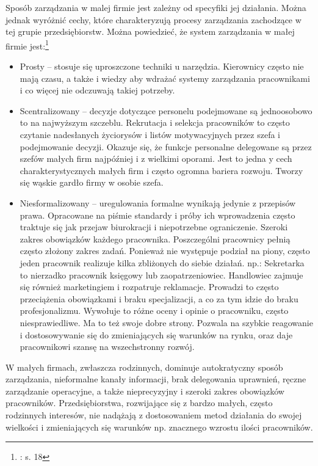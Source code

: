 Sposób zarządzania w malej firmie jest zależny od specyfiki jej działania. Można jednak wyróżnić cechy, które charakteryzują procesy zarządzania zachodzące w tej grupie przedsiębiorstw.
Można powiedzieć, że system zarządzania w małej firmie jest:\footnote{\cite{msr}: s. 18}
\begin{itemize}
\item Prosty – stosuje się uproszczone techniki u narzędzia. Kierownicy często nie mają czasu, a także i wiedzy aby wdrażać systemy zarządzania pracownikami i co więcej nie odczuwają takiej potrzeby.
\item Scentralizowany – decyzje dotyczące personelu podejmowane są jednoosobowo to na najwyższym szczeblu. Rekrutacja i selekcja pracowników to często czytanie nadesłanych życiorysów i listów motywacyjnych przez szefa i podejmowanie decyzji.
Okazuje się, że funkcje personalne delegowane są przez szefów małych firm najpóźniej i z wielkimi oporami. Jest to jedna y cech charakterystycznych małych firm i często ogromna bariera rozwoju. Tworzy się wąskie gardło firmy w osobie szefa.
\item Niesformalizowany – uregulowania formalne wynikają jedynie z przepisów prawa. Opracowane na piśmie standardy i próby ich wprowadzenia często traktuje się jak przejaw biurokracji i niepotrzebne ograniczenie.
Szeroki zakres obowiązków każdego pracownika. Poszczególni pracownicy pełnią często złożony zakres zadań. Ponieważ nie występuje podział na piony, często jeden pracownik realizuje kilka zbliżonych do siebie działań. np.: Sekretarka  to nierzadko pracownik księgowy lub zaopatrzeniowiec. Handlowiec zajmuje się również marketingiem i rozpatruje reklamacje. Prowadzi to często przeciążenia obowiązkami i braku specjalizacji, a co za tym idzie do braku profesjonalizmu. Wywołuje to różne oceny i opinie o pracowniku, często niesprawiedliwe.
Ma to też swoje dobre strony. Pozwala na szybkie reagowanie i dostosowywanie się do zmieniających się warunków na rynku, oraz daje pracownikowi szansę na wszechstronny rozwój.
\end{itemize}

W małych firmach, zwłaszcza rodzinnych, dominuje autokratyczny sposób zarządzania, nieformalne kanały informacji, brak delegowania uprawnień, ręczne zarządzanie operacyjne,  a także nieprecyzyjny i szeroki zakres obowiązków pracowników. Przedsiębiorstwa, rozwijające się z bardzo małych, często rodzinnych interesów, nie nadążają z dostosowaniem metod działania do swojej wielkości i zmieniających się warunków np. znacznego wzrostu ilości pracowników.

